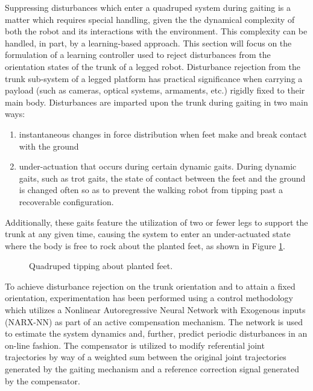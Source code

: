 		Suppressing disturbances which enter a quadruped system during gaiting is a matter which requires special handling, given the the dynamical complexity of both the robot and its interactions with the environment. This complexity can be handled, in part, by a learning-based approach. This section will focus on the formulation of a learning controller used to reject disturbances from the orientation states of the trunk of a legged robot. Disturbance rejection from the trunk sub-system of a legged platform has practical significance when carrying a payload (such as cameras, optical systems, armaments, etc.) rigidly fixed to their main body. Disturbances are imparted upon the trunk during gaiting in two main ways: 
		\begin{enumerate}
			\item instantaneous changes in force distribution when feet make and break contact with the ground 
			\item under-actuation that occurs during certain dynamic gaits. During dynamic gaits, such as trot gaits, the state of contact between the feet and the ground is changed often so as to prevent the walking robot from tipping past a recoverable configuration. 
			\end{enumerate}
		Additionally, these gaits feature the utilization of two or fewer legs to support the trunk at any given time, causing the system to enter an under-actuated state where the body is free to rock about the planted feet, as shown in Figure \ref{fig::quadruped_walking}.
			\begin{figure}[!h]
			\centering
				\caption{Quadruped tipping about planted feet.}
				\label{fig::quadruped_walking}
			\end{figure}
		To achieve disturbance rejection on the trunk orientation and to attain a fixed orientation, experimentation has been performed using a control methodology which utilizes a Nonlinear Autoregressive Neural Network with Exogenous inputs (NARX-NN) as part of an active compensation mechanism. The network is used to estimate the system dynamics and, further, predict periodic disturbances in an on-line fashion. The compensator is utilized to modify referential joint trajectories by way of a weighted sum between the original joint trajectories generated by the gaiting mechanism and a reference correction signal generated by the compensator.

